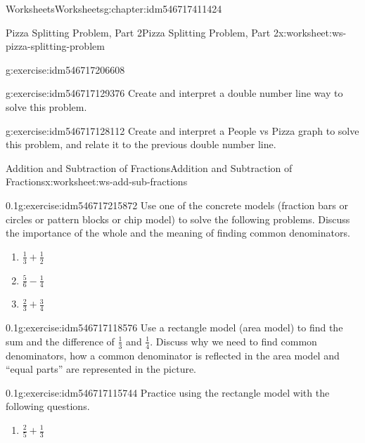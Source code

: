 \documentclass[twoside,11pt,]{book}
\begin{document}
\begin{chapterptx}{Worksheets}{}{Worksheets}{}{}{g:chapter:idm546717411424}
\begin{worksheet-section-numberless}{Pizza Splitting Problem, Part 2}{}{Pizza Splitting Problem, Part 2}{}{}{x:worksheet:ws-pizza-splitting-problem}
\begin{divisionexercise}{4}{}{}{g:exercise:idm546717206608}
\end{divisionexercise}%
\begin{divisionexercise}{5}{}{}{g:exercise:idm546717129376}%
Create and interpret a double number line way to solve this problem.%
\end{divisionexercise}%
\begin{divisionexercise}{6}{}{}{g:exercise:idm546717128112}%
Create and interpret a People vs Pizza graph to solve this problem, and relate it to the previous double number line.%
\end{divisionexercise}%
\end{worksheet-section-numberless}
\restoregeometry
%
%
\typeout{************************************************}
\typeout{************************************************}
%
\begin{worksheet-section-numberless}{Addition and Subtraction of Fractions}{}{Addition and Subtraction of Fractions}{}{}{x:worksheet:ws-add-sub-fractions}
\begin{divisionexercise}{1}{}{0.1}{g:exercise:idm546717215872}%
Use one of the concrete models (fraction bars or circles or pattern blocks or chip model) to solve the following problems. Discuss the importance of the whole and the meaning of finding common denominators.%
%
\begin{enumerate}[label=(\alph*)]
\item{}\(\frac{1}{3} + \frac{1}{2} \)%
\item{}\(\frac{5}{6} - \frac{1}{4} \)%
\item{}\(\frac{2}{3} + \frac{3}{4} \)%
\end{enumerate}
\end{divisionexercise}%
\begin{divisionexercise}{2}{}{0.1}{g:exercise:idm546717118576}%
Use a rectangle model (area model) to find the sum and the difference of \(\frac{1}{3} \) and \(\frac{1}{4} \).  Discuss why we need to find common denominators, how a common denominator is reflected in the area model and “equal parts” are represented in the picture.%
\end{divisionexercise}%
\clearpage
\begin{divisionexercise}{3}{}{0.1}{g:exercise:idm546717115744}%
Practice using the rectangle model with the following questions.%
%
\begin{enumerate}[label=(\alph*)]
\item{}\(\frac{2}{5} + \frac{1}{3} \)%

\end{enumerate}
\end{divisionexercise}
\end{worksheet-section-numberless}
\end{chapterptx}
\end{document}
